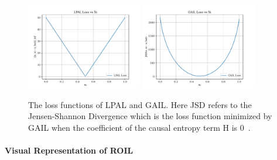 \documentclass[11pt]{uai2023}
\begin{document}
\begin{figure}[htbp]
	\centering
	\includegraphics[width=0.45\textwidth]{../src/plots/all_state/lpal_loss.pdf}
	\includegraphics[width=0.45\textwidth]{../src/plots/all_state/gail_loss.pdf}
	\caption{The loss functions of LPAL and GAIL. Here JSD refers to the Jensen-Shannon Divergence which is the loss function minimized by GAIL when the coefficient of the 
 causal entropy term H is 0~\cite{Ho2016}.}
	\label{fig:loss_of_LPAL_GAIL}
\end{figure}

\paragraph{Visual Representation of ROIL}
\end{document}
